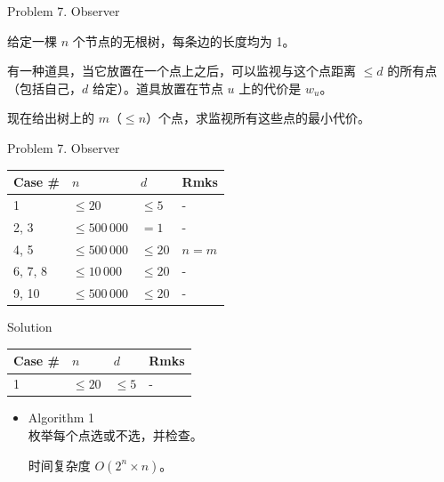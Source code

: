 \documentclass[UTF8]{beamer}
\begin{document}

\begin{frame}{Problem 7. Observer}

给定一棵 $n$ 个节点的无根树，每条边的长度均为 1。

有一种道具，当它放置在一个点上之后，可以监视与这个点距离 $\leq d$ 的所有点
（包括自己，$d$ 给定）。道具放置在节点 $u$ 上的代价是 $w_u$。

现在给出树上的 $m$（$ \leq n$）个点，求监视所有这些点的最小代价。

\end{frame}

\begin{frame}{Problem 7. Observer}

\begin{tabularx}{\textwidth}{X|X|X|X} \hline
Case \# & $n$ & $d$ & Rmks \\ \hline \hline
1       & $\leq 20$       & $\leq 5$  & - \\ \hline
2, 3    & $\leq 500\,000$ & $= 1$     & - \\ \hline
4, 5    & $\leq 500\,000$ & $\leq 20$ & $n = m$ \\ \hline
6, 7, 8 & $\leq 10\,000$  & $\leq 20$ & - \\ \hline
9, 10   & $\leq 500\,000$ & $\leq 20$ & - \\ \hline
\end{tabularx}

\end{frame}

\begin{frame}{Solution}

\begin{tabularx}{\textwidth}{X|X|X|X} \hline
Case \# & $n$ & $d$ & Rmks \\ \hline \hline
1       & $\leq 20$       & $\leq 5$  & - \\ \hline
\end{tabularx}
\begin{itemize}
    \item Algorithm 1 \\
        枚举每个点选或不选，并检查。

        时间复杂度 $O(2^n \times n)$。
\end{itemize}

\end{frame}
\end{document}
